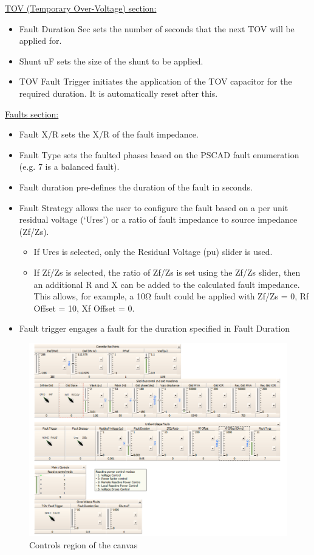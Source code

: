 \documentclass{../grid-link-report}
\begin{document}
		\underline{TOV (Temporary Over-Voltage) section:}
	\begin{itemize}
		\item Fault Duration Sec sets the number of seconds that the next TOV will be applied for.
		\item Shunt uF sets the size of the shunt to be applied.
		\item TOV Fault Trigger initiates the application of the TOV capacitor for the required duration. It is automatically reset after this.
	\end{itemize}
	\underline{Faults section:}
	\begin{itemize}
		\item Fault X/R sets the X/R of the fault impedance.
		\item Fault Type sets the faulted phases based on the PSCAD fault enumeration (e.g. 7 is a balanced fault).
		\item Fault duration pre-defines the duration of the fault in seconds.
		\item Fault Strategy allows the user to configure the fault based on a per unit residual voltage (‘Ures’) or a ratio of fault impedance to source impedance (Zf/Zs).
		\begin{itemize}
			\item If Ures is selected, only the Residual Voltage (pu) slider is used.
			\item If Zf/Zs is selected, the ratio of Zf/Zs is set using the Zf/Zs slider, then an additional R and X can be added to the calculated fault impedance. This allows, for example, a 10Ω fault could be applied with Zf/Zs = 0, Rf Offset = 10, Xf Offset = 0. 
		\end{itemize}
		\item Fault trigger engages a fault for the duration specified in Fault Duration
	\end{itemize}
	
	\begin{figure}[H]
		\centering
		\includegraphics[width=\textwidth]{report-assets/images/PPC-CANVAS.png}
		\caption{Controls region of the canvas}
		\label{fig:control-canvas}
	\end{figure}
	
\end{document}
